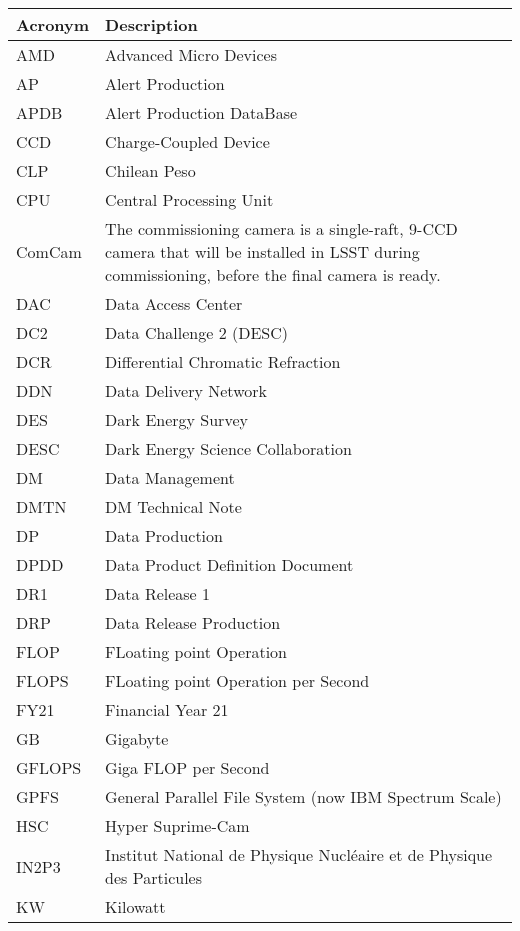 \addtocounter{table}{-1}
\begin{longtable}{p{}p{}}\hline
\textbf{Acronym} & \textbf{Description}  \\\hline

AMD & Advanced Micro Devices \\\hline
AP & Alert Production \\\hline
APDB & Alert Production DataBase \\\hline
CCD & Charge-Coupled Device \\\hline
CLP & Chilean Peso \\\hline
CPU & Central Processing Unit \\\hline
ComCam & The commissioning camera is a single-raft, 9-CCD camera that will be installed in LSST during commissioning, before the final camera is ready. \\\hline
DAC & Data Access Center \\\hline
DC2 & Data Challenge 2 (DESC) \\\hline
DCR & Differential Chromatic Refraction \\\hline
DDN & Data Delivery Network \\\hline
DES & Dark Energy Survey \\\hline
DESC & Dark Energy Science Collaboration \\\hline
DM & Data Management \\\hline
DMTN & DM Technical Note \\\hline
DP & Data Production \\\hline
DPDD & Data Product Definition Document \\\hline
DR1 & Data Release 1 \\\hline
DRP & Data Release Production \\\hline
FLOP & FLoating point Operation \\\hline
FLOPS & FLoating point Operation per Second \\\hline
FY21 & Financial Year 21 \\\hline
GB & Gigabyte \\\hline
GFLOPS & Giga FLOP per Second \\\hline
GPFS & General Parallel File System (now IBM Spectrum Scale) \\\hline
HSC & Hyper Suprime-Cam \\\hline
IN2P3 & Institut National de Physique Nucléaire et de Physique des Particules \\\hline
KW & Kilowatt \\\hline

\end{longtable}

